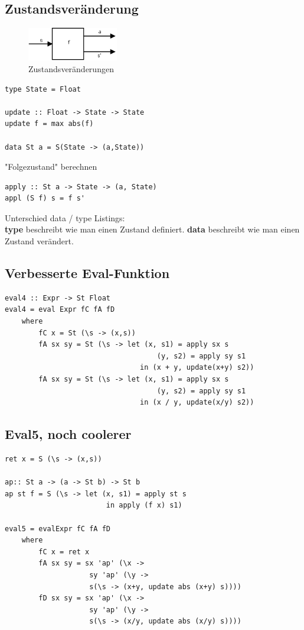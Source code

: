 \documentclass[ngerman,a4paper]{report}
\begin{document}
\subsection{Zustandsveränderung}

\begin{figure}[h]
	\centering
	\includegraphics[width=150px]{gfx/state_trans1.png}
	\caption{Zustandsveränderungen}
	\label{img:statetrans}
\end{figure}

\begin{lstlisting}
type State = Float

update :: Float -> State -> State
update f = max abs(f)

data St a = S(State -> (a,State))
\end{lstlisting}

"Folgezustand" berechnen

\begin{lstlisting}
apply :: St a -> State -> (a, State)
appl (S f) s = f s'
\end{lstlisting}

Unterschied data / type Listings:\\
\textbf{type} beschreibt wie man einen Zustand definiert.
\textbf{data} beschreibt wie man einen Zustand verändert.

\subsection{Verbesserte Eval-Funktion}
\begin{lstlisting}
eval4 :: Expr -> St Float
eval4 = eval Expr fC fA fD
	where
		fC x = St (\s -> (x,s))
		fA sx sy = St (\s -> let (x, s1) = apply sx s
									(y, s2) = apply sy s1
								in (x + y, update(x+y) s2))
		fA sx sy = St (\s -> let (x, s1) = apply sx s
									(y, s2) = apply sy s1
								in (x / y, update(x/y) s2))
\end{lstlisting}

\subsection{Eval5, noch coolerer}
\begin{lstlisting}
ret x = S (\s -> (x,s))

ap:: St a -> (a -> St b) -> St b
ap st f = S (\s -> let (x, s1) = apply st s
						in apply (f x) s1)

eval5 = evalExpr fC fA fD
	where
		fC x = ret x
		fA sx sy = sx 'ap' (\x ->
					sy 'ap' (\y ->
					s(\s -> (x+y, update abs (x+y) s))))
		fD sx sy = sx 'ap' (\x ->
					sy 'ap' (\y ->
					s(\s -> (x/y, update abs (x/y) s))))
\end{lstlisting}
\end{document}
